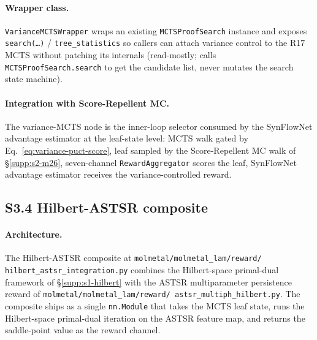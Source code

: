 \paragraph{Wrapper class.}
\texttt{VarianceMCTSWrapper} wraps an existing
\texttt{MCTSProofSearch} instance and exposes
\texttt{search(\dots)} / \texttt{tree\_statistics} so callers can
attach variance control to the R17 MCTS without patching its
internals (read-mostly; calls \texttt{MCTSProofSearch.search} to
get the candidate list, never mutates the search state machine).

\paragraph{Integration with Score-Repellent MC.}
The variance-MCTS node is the inner-loop selector consumed by the
SynFlowNet advantage estimator at the leaf-state level: MCTS walk
gated by Eq.~\eqref{eq:variance-puct-score}, leaf sampled by the
Score-Repellent MC walk of \S\ref{supp:s2-m26}, seven-channel
\texttt{RewardAggregator} scores the leaf, SynFlowNet advantage
estimator receives the variance-controlled reward.

\subsection*{S3.4 Hilbert-ASTSR composite}
\label{supp:s3-hilbert-astsr}

\paragraph{Architecture.}
The Hilbert-ASTSR composite at
\texttt{molmetal/molmetal\_lam/reward/
hilbert\_astsr\_integration.py} combines the Hilbert-space
primal-dual framework of \S\ref{supp:s1-hilbert} with the ASTSR
multiparameter persistence reward of
\texttt{molmetal/molmetal\_lam/reward/
astsr\_multiph\_hilbert.py}.  The composite ships as a single
\texttt{nn.Module} that takes the MCTS leaf state, runs the
Hilbert-space primal-dual iteration on the ASTSR feature map, and
returns the saddle-point value as the reward channel.

